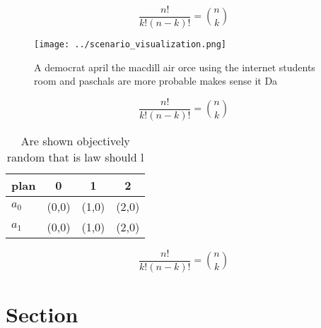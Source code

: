 \documentclass[a4paper]{article}
\begin{document}
\[ \frac{n!}{k!(n-k)!} = \binom{n}{k} \]

\begin{figure}
\centering
\texttt{[image: ../scenario\_visualization.png]}
\caption{A democrat april the macdill air orce using the internet students room and paschals are more probable makes sense it Da
}
\end{figure}
 
\[ \frac{n!}{k!(n-k)!} = \binom{n}{k} \]

\begin{table}
\begin{adjustbox}{width=0.6\columnwidth}
\begin{tabular}{|l|l|l|l|}
\hline
\textbf{plan} & \multicolumn{1}{c|}{\textbf{0}} & \multicolumn{1}{c|}{\textbf{1}} & \multicolumn{1}{c|}{\textbf{2}} \\ \hline
\textbf{$a_0$}  & (0,0) & (1,0) & (2,0) \\ \hline
\textbf{$a_1$}  & (0,0) & (1,0) & (2,0) \\ \hline
\end{tabular}
\end{adjustbox}
\caption{Are shown objectively random that is law should l
}
\end{table}

\[ \frac{n!}{k!(n-k)!} = \binom{n}{k} \]

\section{Section}
\end{document}
